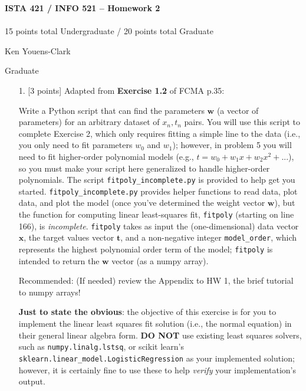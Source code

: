 \documentclass[10pt]{article}
\begin{document}
\begin{center}
    {\Large {\bf ISTA 421 / INFO 521 -- Homework 2}} \\
     \\
    15 points total Undergraduate / 20 points total Graduate

\end{center}

\begin{flushright}
Ken Youens-Clark 

Graduate
\end{flushright}



\begin{itemize}



\item[1.] [3 points]
Adapted from {\bf Exercise 1.2} of FCMA p.35:

Write a Python script that can find the parameters $\mathbf{w}$ (a vector of parameters) for an arbitrary dataset of $x_n, t_n$ pairs.  You will use this script to complete Exercise 2, which only requires fitting a simple line to the data (i.e., you only need to fit parameters $w_0$ and $w_1$); however, in problem 5 you will need to fit higher-order polynomial models (e.g., $t = w_0 + w_1x + w_2x^2 + ...$), so you must make your script here generalized to handle higher-order polynomials.  The script {\tt fitpoly\_incomplete.py} is provided to help get you started.  {\tt fitpoly\_incomplete.py} provides helper functions to read data, plot data, and plot the model (once you've determined the weight vector $\mathbf{w}$), but the function for computing linear least-squares fit, {\tt fitpoly} (starting on line 166), is {\em incomplete}.  {\tt fitpoly} takes as input the (one-dimensional) data vector $\mathbf{x}$, the target values vector $\mathbf{t}$, and a non-negative integer {\tt model\_order}, which represents the highest polynomial order term of the model; {\tt fitpoly} is intended to return the $\mathbf{w}$ vector (as a numpy array).

Recommended: (If needed) review the Appendix to HW 1, the brief tutorial to numpy arrays!

{\bf Just to state the obvious}: the objective of this exercise is for you to implement the linear least squares fit solution (i.e., the normal equation) in their general linear algebra form.  {\bf DO NOT} use existing least squares solvers, such as {\tt numpy.linalg.lstsq}, or scikit learn's \\{\tt sklearn.linear\_model.LogisticRegression} as your implemented solution; however, it is certainly fine to use these to help {\em verify} your implementation's output.


\end{itemize}
\end{document}
